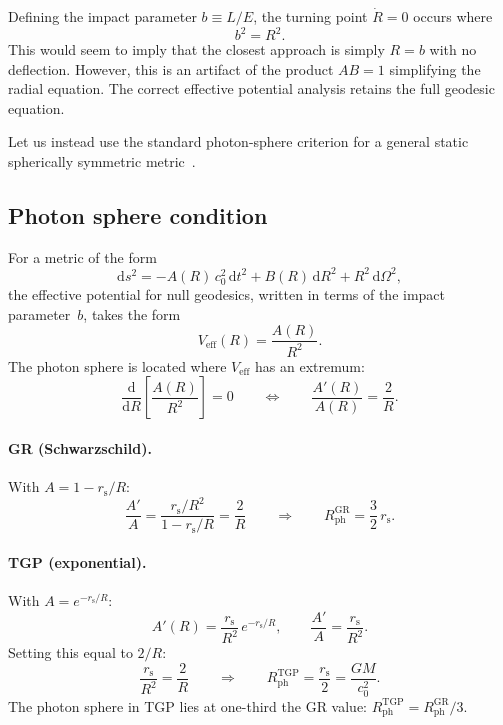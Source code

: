 \documentclass[11pt,a4paper]{article}
\theoremstyle{definition}
\theoremstyle{remark}
\newcommand{\rs}{r_{\mathrm{s}}}
\newcommand{\dd}{\mathrm{d}}
\begin{document}
Defining the impact parameter $b \equiv L/E$, the turning point
$\dot{R} = 0$ occurs where
\begin{equation}\label{eq:turning}
  b^2 = R^2.
\end{equation}
This would seem to imply that the closest approach is simply $R = b$
with no deflection.  However, this is an artifact of the product $AB = 1$
simplifying the radial equation.  The correct effective potential
analysis retains the full geodesic equation.

Let us instead use the standard photon-sphere criterion for a general
static spherically symmetric metric~\cite{Chandrasekhar1983,Perlick2022}.

\subsection{Photon sphere condition}\label{ssec:photon-sphere}

For a metric of the form
\begin{equation}
  \dd s^2 = -A(R)\,c_0^2\,\dd t^2 + B(R)\,\dd R^2 + R^2\,\dd\Omega^2,
\end{equation}
the effective potential for null geodesics, written in terms of the
impact parameter~$b$, takes the form
\begin{equation}\label{eq:Veff}
  V_{\mathrm{eff}}(R)
  = \frac{A(R)}{R^2}.
\end{equation}
The photon sphere is located where $V_{\mathrm{eff}}$ has an extremum:
\begin{equation}\label{eq:photon-sphere-areal}
  \frac{\dd}{\dd R}\!\left[\frac{A(R)}{R^2}\right] = 0
  \qquad\Longleftrightarrow\qquad
  \frac{A'(R)}{A(R)} = \frac{2}{R}.
\end{equation}

\paragraph{GR (Schwarzschild).}
With $A = 1 - \rs/R$:
\begin{equation}
  \frac{A'}{A} = \frac{\rs/R^2}{1 - \rs/R} = \frac{2}{R}
  \qquad\Longrightarrow\qquad
  R_{\mathrm{ph}}^{\mathrm{GR}} = \frac{3}{2}\,\rs.
\end{equation}

\paragraph{TGP (exponential).}
With $A = e^{-\rs/R}$:
\begin{equation}
  A'(R) = \frac{\rs}{R^2}\,e^{-\rs/R},
  \qquad
  \frac{A'}{A} = \frac{\rs}{R^2}.
\end{equation}
Setting this equal to $2/R$:
\begin{equation}\label{eq:rph-TGP}
  \frac{\rs}{R^2} = \frac{2}{R}
  \qquad\Longrightarrow\qquad
  \boxed{R_{\mathrm{ph}}^{\mathrm{TGP}} = \frac{\rs}{2}
  = \frac{GM}{c_0^2}.}
\end{equation}
The photon sphere in TGP lies at one-third the GR value: $R_{\mathrm{ph}}^{\mathrm{TGP}} = R_{\mathrm{ph}}^{\mathrm{GR}}/3$.
\end{document}
